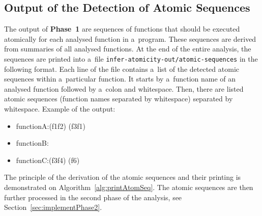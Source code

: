 \subsection{Output of the Detection of Atomic Sequences}
\label{sec:implementPhase1Out}

The output of \textbf{Phase~1} are sequences of functions that should
be executed atomically for each analysed function in a~program.
These sequences are derived from summaries of all analysed functions.
At the end of the entire analysis, the sequences are printed into a~file
\texttt{infer-atomicity-out/atomic-sequences} in the following format. Each
line of the file contains a~list of the detected atomic sequences within
a~particular function. It starts by a~function name of an analysed function
followed by a~colon and whitespace. Then, there are listed atomic sequences
(function names separated by whitespace) separated by whitespace.
Example of the output:
\begin{samepage}
    \begin{itemize}[label=]
        \tt
        \setlength\itemsep{0em}

        \item
            functionA:{\textvisiblespace}(f1{\textvisiblespace}f2)%
            {\textvisiblespace}(f3{\textvisiblespace}f1)

        \item
            functionB:{\textvisiblespace}

        \item
            functionC:{\textvisiblespace}(f3{\textvisiblespace}f4)%
            {\textvisiblespace}(f6)
    \end{itemize}
\end{samepage}
The principle of the derivation of the atomic sequences and their printing
is demonstrated on Algorithm~\ref{alg:printAtomSeq}. The atomic sequences
are then further processed in the second phase of the analysis, see
Section~\ref{sec:implementPhase2}.

\begin{algorithm}[hbt]



    \caption{%
        Printing atomic sequences from summaries of all analysed functions
    }
    \label{alg:printAtomSeq}
\end{algorithm}


